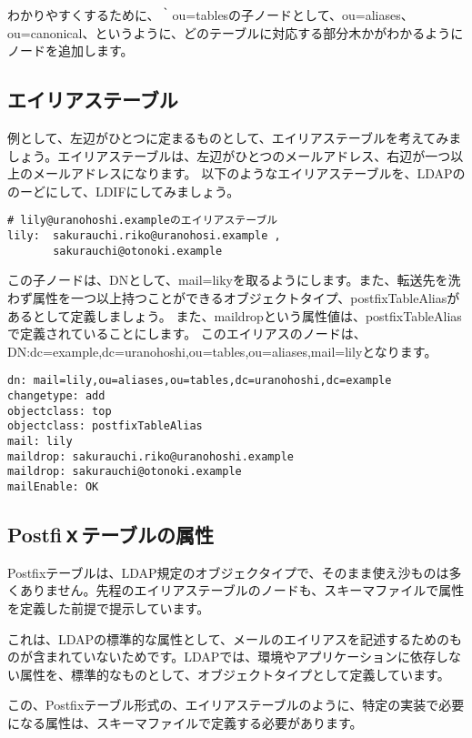 わかりやすくするために、｀ou=tablesの子ノードとして、ou=aliases、ou=canonical、というように、どのテーブルに対応する部分木かがわかるようにノードを追加します。


\subsection{エイリアステーブル}

例として、左辺がひとつに定まるものとして、エイリアステーブルを考えてみましょう。エイリアステーブルは、左辺がひとつのメールアドレス、右辺が一つ以上のメールアドレスになります。
以下のようなエイリアステーブルを、LDAPののーどにして、LDIFにしてみましょう。

\begin{verbatim}
# lily@uranohoshi.exampleのエイリアステーブル
lily:  sakurauchi.riko@uranohosi.example , 
       sakurauchi@otonoki.example
\end{verbatim}

この子ノードは、DNとして、mail=likyを取るようにします。また、転送先を洗わず属性を一つ以上持つことができるオブジェクトタイプ、postfixTableAliasがあるとして定義しましょう。
また、maildropという属性値は、postfixTableAliasで定義されていることにします。
このエイリアスのノードは、DN:dc=example,dc=uranohoshi,ou=tables,ou=aliases,mail=lilyとなります。

\begin{verbatim}
dn: mail=lily,ou=aliases,ou=tables,dc=uranohoshi,dc=example
changetype: add
objectclass: top
objectclass: postfixTableAlias
mail: lily
maildrop: sakurauchi.riko@uranohoshi.example
maildrop: sakurauchi@otonoki.example
mailEnable: OK
\end{verbatim}

\subsection{Postfiｘテーブルの属性}

Postfixテーブルは、LDAP規定のオブジェクタイプで、そのまま使え沙ものは多くありません。先程のエイリアステーブルのノードも、スキーマファイルで属性を定義した前提で提示しています。

これは、LDAPの標準的な属性として、メールのエイリアスを記述するためのものが含まれていないためです。LDAPでは、環境やアプリケーションに依存しない属性を、標準的なものとして、オブジェクトタイプとして定義しています。

この、Postfixテーブル形式の、エイリアステーブルのように、特定の実装で必要になる属性は、スキーマファイルで定義する必要があります。

